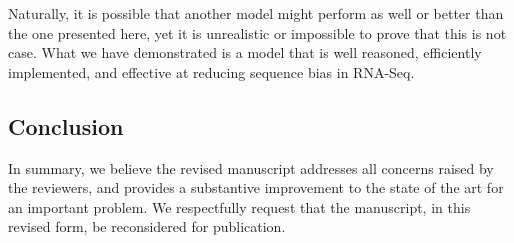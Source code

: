 \documentclass{article}
\begin{document}
Naturally, it is possible that another model might perform as well or better
than the one presented here, yet it is unrealistic or impossible to prove that
this is not case. What we have demonstrated is a model that is well reasoned,
efficiently implemented, and effective at reducing sequence bias in RNA-Seq.




\subsection*{Conclusion}
In summary, we believe the revised manuscript addresses all concerns
raised by the reviewers, and provides a substantive improvement to the
state of the art for an important problem.  We respectfully request
that the manuscript, in this revised form, be reconsidered for
publication.
\end{document}
